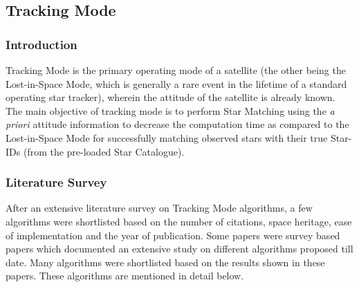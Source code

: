 \documentclass[../../main.tex]{subfiles}
\begin{document}
\subsection{Tracking Mode}

\subsubsection{Introduction}
Tracking Mode is the primary operating mode of a satellite (the other being the Lost-in-Space Mode, which is generally a rare event in the lifetime of a standard operating star tracker), wherein the attitude of the satellite is already known. The main objective of tracking mode is to perform Star Matching using the \textit{a priori} attitude information to decrease the computation time as compared to the Lost-in-Space Mode for successfully matching observed stars with their true Star-IDs (from the pre-loaded Star Catalogue). 

\subsubsection{Literature Survey}
After an extensive literature survey on Tracking Mode algorithms, a few algorithms were shortlisted based on the number of citations, space heritage, ease of implementation and the year of publication. Some papers were survey based papers which documented an extensive study on different algorithms proposed till date. Many algorithms were shortlisted based on the results shown in these papers. These algorithms are mentioned in detail below. 
\end{document}
